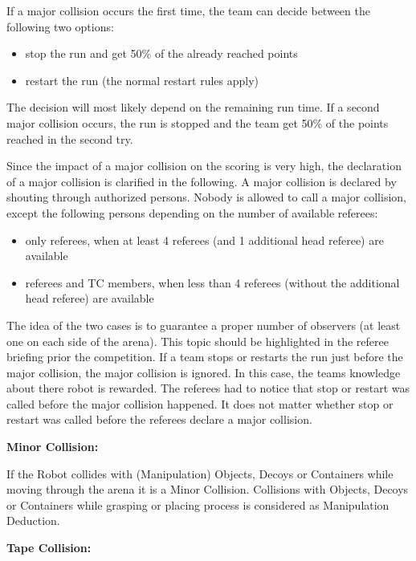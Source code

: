 If a major collision occurs the first time, the team can decide between the following two options:
\begin{itemize}
	\item stop the run and get 50\% of the already reached points
	\item restart the run (the normal restart rules apply)
\end{itemize}
The decision will most likely depend on the remaining run time. If a second major collision occurs, the run is stopped and the team get 50\% of the points reached in the second try.


Since the impact of a major collision on the scoring is very high, the declaration of a major collision is clarified in the following. A major collision is declared by shouting through authorized persons. Nobody is allowed to call a major collision, except the following persons depending on the number of available referees:
\begin{itemize}
	\item only referees, when at least 4 referees (and 1 additional head referee) are available
	\item referees and TC members, when less than 4 referees (without the additional head referee) are available
\end{itemize}
The idea of the two cases is to guarantee a proper number of observers (at least one on each side of the arena). This topic should be highlighted in the referee briefing prior the competition. If a team stops or restarts the run just before the major collision, the major collision is ignored. In this case, the teams knowledge about there robot is rewarded. The referees had to notice that stop or restart was called before the major collision happened. It does not matter whether stop or restart was called before the referees declare a major collision.


\textbf{Minor Collision:}

If the Robot collides with (Manipulation) Objects, Decoys or Containers while moving through the arena it is a Minor Collision. Collisions with Objects, Decoys or Containers while grasping or placing process is considered as Manipulation Deduction.


\textbf{Tape Collision:}

